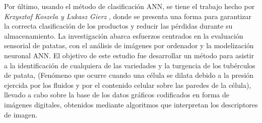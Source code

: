 	Por último, usando el método de clasificación ANN, se tiene el trabajo hecho por \textit{Krzysztof Koszela y Lukasz Gierz} \cite{Przybyl2019}, donde se presenta una forma para garantizar la correcta clasificación de los productos y reducir las pérdidas durante su almacenamiento. La investigación abarca esfuerzos centrados en la evaluación sensorial de patatas, con el análisis de imágenes por ordenador y la modelización neuronal ANN. El objetivo de este estudio fue desarrollar un método para asistir a la identificación de cualquiera de las variedades y la turgencia de los tubérculos de patata, (Fenómeno que ocurre cuando una célula se dilata debido a la presión ejercida por los fluidos y por el contenido celular sobre las paredes de la célula), llevado a cabo sobre la base de los datos gráficos codificados en forma de imágenes digitales, obtenidos mediante algoritmos que interpretan los descriptores de imagen.\\

